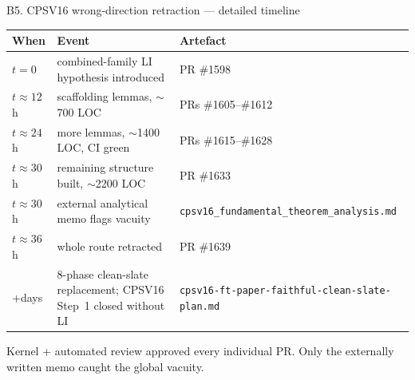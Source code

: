 \documentclass[aspectratio=169,10pt]{beamer}
\begin{document}
\begin{frame}{B5. CPSV16 wrong-direction retraction --- detailed timeline}
    \begin{center}
    \renewcommand{\arraystretch}{1.2}
    {\footnotesize
    \begin{tabular}{@{}l l l@{}}
        \toprule
        \textbf{When} & \textbf{Event} & \textbf{Artefact} \\
        \midrule
        $t = 0$            & combined-family LI hypothesis introduced            & PR \#1598 \\
        $t \approx 12$h    & scaffolding lemmas, $\sim$700 LOC                  & PRs \#1605--\#1612 \\
        $t \approx 24$h    & more lemmas, $\sim$1400 LOC, CI green               & PRs \#1615--\#1628 \\
        $t \approx 30$h    & remaining structure built, $\sim$2200 LOC          & PR \#1633 \\
        $t \approx 30$h    & external analytical memo flags vacuity              & \texttt{cpsv16\_fundamental\_theorem\_analysis.md} \\
        $t \approx 36$h    & whole route retracted                               & PR \#1639 \\
        +days              & 8-phase clean-slate replacement; CPSV16 Step~1 closed without LI & \texttt{cpsv16-ft-paper-faithful-clean-slate-plan.md} \\
        \bottomrule
    \end{tabular}}
    \end{center}
    \vspace{0.4em}
    \textcolor{dimwhite}{\footnotesize Kernel + automated review approved every individual PR. Only the externally written memo caught the global vacuity.}
\end{frame}
\end{document}
